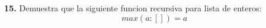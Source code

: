 \textbf{15.} Demuestra que la siguiente funcion recursiva para lista de enteros:
\[
max(a : []) = a
\]
 

